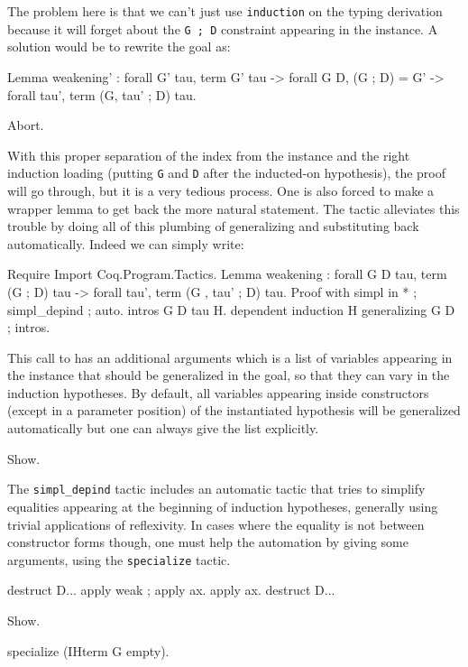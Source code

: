 The problem here is that we can't just use {\tt induction} on the typing
derivation because it will forget about the {\tt G ; D} constraint
appearing in the instance. A solution would be to rewrite the goal as:
\begin{coq_example*}
Lemma weakening' : forall G' tau, term G' tau -> 
  forall G D, (G ; D) = G' ->
  forall tau', term (G, tau' ; D) tau.
\end{coq_example*}
\begin{coq_eval}
  Abort.
\end{coq_eval}

With this proper separation of the index from the instance and the right
induction loading (putting {\tt G} and {\tt D} after the inducted-on
hypothesis), the proof will go through, but it is a very tedious
process. One is also forced to make a wrapper lemma to get back the
more natural statement. The \depind tactic alleviates this trouble by
doing all of this plumbing of generalizing and substituting back automatically.
Indeed we can simply write:

\begin{coq_example*}
Require Import Coq.Program.Tactics.
Lemma weakening : forall G D tau, term (G ; D) tau -> 
  forall tau', term (G , tau' ; D) tau.
Proof with simpl in * ; simpl_depind ; auto.
  intros G D tau H. dependent induction H generalizing G D ; intros.
\end{coq_example*}

This call to \depind has an additional arguments which is a list of
variables appearing in the instance that should be generalized in the
goal, so that they can vary in the induction hypotheses. By default, all
variables appearing inside constructors (except in a parameter position)
of the instantiated hypothesis will be generalized automatically but
one can always give the list explicitly.

\begin{coq_example}
  Show.
\end{coq_example}

The {\tt simpl\_depind} tactic includes an automatic tactic that tries
to simplify equalities appearing at the beginning of induction
hypotheses, generally using trivial applications of
reflexivity. In cases where the equality is not between constructor
forms though, one must help the automation by giving
some arguments, using the {\tt specialize} tactic.

\begin{coq_example*}
destruct D... apply weak ; apply ax. apply ax.
destruct D...
\end{coq_example*}
\begin{coq_example}
Show.
\end{coq_example}
\begin{coq_example}
  specialize (IHterm G empty).
\end{coq_example}

